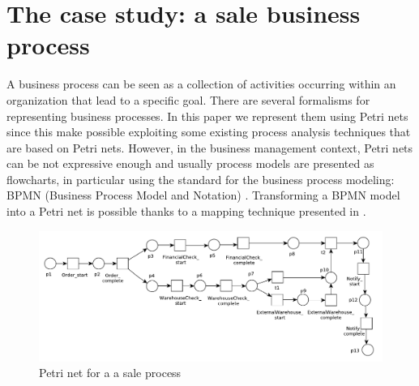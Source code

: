 \documentclass{llncs}
\begin{document}
\section{The case study: a sale business process}\label{example}
A business process can be seen as a collection of activities occurring within an organization that lead to a specific goal. There are several formalisms for representing business processes. In this paper we represent them using Petri nets \cite{DBLP:conf/ifip/Petri62}\cite{DBLP:journals/jcsc/Aalst98} since this make possible exploiting some existing process analysis techniques that are based on Petri nets. However, in the business management context, Petri nets can be not expressive enough and usually process models are presented as flowcharts, in particular using the standard for the business process modeling: BPMN (Business Process Model and Notation) \cite{BPMN}. Transforming a BPMN model into a Petri net is possible thanks to a mapping technique presented in \cite{DBLP:conf/wsfm/BruniCFFGS11}.
\begin{figure}[h]
\includegraphics[width=360pt]
{./items/Sales_PN.pdf}
\caption{Petri net for a a sale process}
\label{pnet}
\end{figure}
\end{document}
